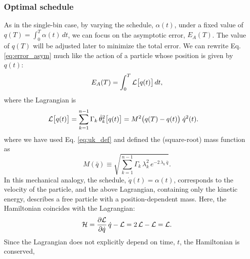 \documentclass[preprint, superscriptaddress, floatfix]{revtex4-1}
\newcommand{\Err}{E}
\begin{document}
\subsubsection{\label{sec:optschedule}
Optimal schedule}



As in the single-bin case,
by varying the schedule, $\alpha(t)$, under a fixed value of
$q(T) = \int_0^T \alpha(t) \, dt$,
we can focus on the asymptotic error,
$\Err_A(T)$.
%
The value of $q(T)$ will be adjusted later
to minimize the total error. %
%
We can rewrite Eq. \eqref{eq:error_asym} much like the action
of a particle whose position is given by $q(t)$:
%
\begin{equation}
  \Err_A(T)
  =
  \int_0^T
    {\mathcal L} \bigl[ q(t)\bigr]
    \, dt
  ,
  \notag
\end{equation}
%
where the Lagrangian is
%
\begin{align}
  {\mathcal L} \bigl[ q(t) \bigr]
  &=
  \sum_{ k = 1 }^{n - 1}
    \Gamma_k \, {\dot \theta}_k^2\bigl[ q(t) \bigr]
  =
  M^2\bigl(q(T) - q(t) \bigr)
  \; \dot q^2( t )
  .
\notag
\end{align}
%
where we have
used Eq. \eqref{eq:uk_def} and
defined the (square-root) mass function as
%
\begin{equation}
  M(\bar q)
  \equiv
  \sqrt{
    \textstyle\sum_{ k = 1 }^{n - 1}
    \Gamma_k \, \lambda_k^2 \, e^{-2 \, \lambda_k \, \bar q}
  }
  .
  \label{eq:mass_func}
\end{equation}
%
In this mechanical analogy,
the schedule, $\dot q(t) = \alpha(t)$,
corresponds to the velocity of the particle,
%
and the above Lagrangian, containing only the kinetic energy,
describes a free particle
with a position-dependent mass.
%
Here, the Hamiltonian coincides with the Lagrangian:
%
\begin{equation}
  \mathcal H
  =
  \frac{ \partial \mathcal L }
       { \partial \dot q     }
  \, \dot q
  -
  \mathcal L
  =
  2 \, \mathcal L
  - \mathcal L
  =
  \mathcal L
  .
  \notag
\end{equation}
%
Since the Lagrangian
does not explicitly depend on time, $t$,
the Hamiltonian is conserved,\cite{goldstein, *landau_mechanics, *arnold, *jose}
\end{document}
